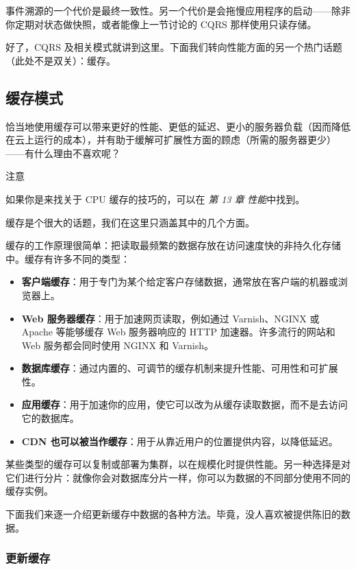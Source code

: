 事件溯源的一个代价是最终一致性。另一个代价是会拖慢应用程序的启动——除非你定期对状态做快照，或者能像上一节讨论的 CQRS 那样使用只读存储。

好了，CQRS 及相关模式就讲到这里。下面我们转向性能方面的另一个热门话题（此处不是双关）：缓存。

\subsection{缓存模式}

\label{idx:382}
恰当地使用缓存可以带来更好的性能、更低的延迟、更小的服务器负载（因而降低在云上运行的成本），并有助于缓解可扩展性方面的顾虑（所需的服务器更少）——有什么理由不喜欢呢？

\begin{myNotic}{注意}

如果你是来找关于 CPU 缓存的技巧的，可以在 \emph{第 13 章} \emph{性能}中找到。
\end{myNotic}

缓存是个很大的话题，我们在这里只涵盖其中的几个方面。

缓存的工作原理很简单：把读取最频繁的数据存放在访问速度快的非持久化存储中。缓存有许多不同的类型：

\begin{itemize}
\label{idx:383}
\item \textbf{客户端缓存}：用于专门为某个给定客户存储数据，通常放在客户端的机器或浏览器上。
\label{idx:384}
\item \textbf{Web 服务器缓存}：用于加速网页读取，例如通过 Varnish、NGINX 或 Apache 等能够缓存 Web 服务器响应的 HTTP 加速器。许多流行的网站和 Web 服务都会同时使用 NGINX 和 Varnish。
\label{idx:385}
\item \textbf{数据库缓存}：通过内置的、可调节的缓存机制来提升性能、可用性和可扩展性。
\label{idx:386}
\item \textbf{应用缓存}：用于加速你的应用，使它可以改为从缓存读取数据，而不是去访问它的数据库。
\item \textbf{CDN 也可以被当作缓存}：用于从靠近用户的位置提供内容，以降低延迟。
\end{itemize}

某些类型的缓存可以复制或部署为集群，以在规模化时提供性能。另一种选择是对它们进行分片：就像你会对数据库分片一样，你可以为数据的不同部分使用不同的缓存实例。

下面我们来逐一介绍更新缓存中数据的各种方法。毕竟，没人喜欢被提供陈旧的数据。

\subsubsection{更新缓存}

